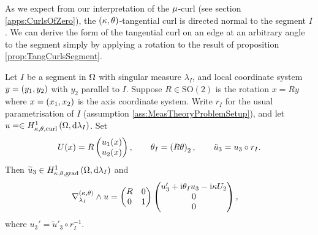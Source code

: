 As we expect from our interpretation of the $\mu$-curl (see section \ref{apps:CurlsOfZero}), the $\left( \kappa, \theta \right)$-tangential curl is directed normal to the segment $I$.
We can derive the form of the tangential curl on an edge at an arbitrary angle to the segment simply by applying a rotation to the result of proposition \ref{prop:TangCurlsSegment}.
\begin{cory} \label{cory:TangCurlRotated}
	Let $I$ be a segment in $\Omega$ with singular measure $\lambda_I$, and local coordinate system $y=\left( y_1, y_2 \right)$ with $y_2$ parallel to $I$.
	Suppose $R\in\mathrm{SO}(2)$ is the rotation $x=Ry$ where $x=\left( x_1, x_2 \right)$ is the axis coordinate system.
	Write $r_I$ for the usual parametrisation of $I$ (assumption \ref{ass:MeasTheoryProblemSetup}), and let $u=\in H^1_{\kappa,\theta,\mathrm{curl}}\left( \Omega, \mathrm{d}\lambda_I \right)$.
	Set
	\begin{align*}
		U(x) = R \begin{pmatrix} u_1(x) \\ u_2(x) \end{pmatrix}, 
		\qquad \theta_I = \left(  R\theta  \right)_2,
		\qquad \tilde{u}_3 = u_3 \circ r_I.
	\end{align*}
	Then $\widetilde{u}_3\in H^1_{\kappa,\theta,\mathrm{grad}}\left( \Omega, \mathrm{d}\lambda_I \right)$ and 
	\begin{align*}
		\nabla_{\lambda_I}^{\left( \kappa, \theta \right)}\wedge u &= \begin{pmatrix} R & 0 \\ 0 & 1	\end{pmatrix}
		\begin{pmatrix} u_3' + \mathrm{i}\theta_I u_3 - \mathrm{i}\kappa U_2 \\ 0 \\ 0 \end{pmatrix},
	\end{align*}
	where $u_3' = \widetilde{u}'_3 \circ r_I^{-1}$.
\end{cory}

